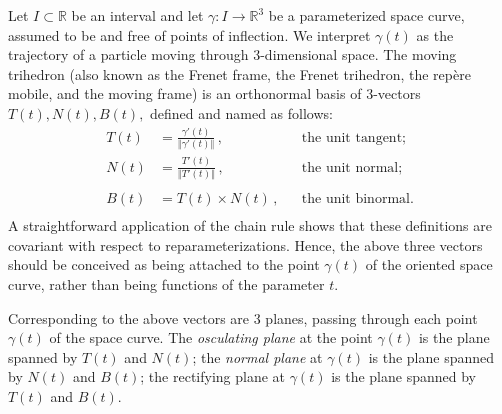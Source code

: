 \documentclass{article}
\newcommand{\reals}{\mathbb{R}}
\begin{document}
Let $I\subset \reals$ be an interval and let $\gamma:I\to\reals^3$ be a
parameterized space curve, assumed to be
 and free of points of inflection. We
interpret $\gamma(t)$ as the trajectory of a particle moving through
3-dimensional space.  The moving trihedron (also known as the Frenet
frame, the Frenet trihedron, the rep\`ere mobile, and the moving
frame) is an orthonormal basis of 3-vectors $T(t),N(t),B(t),$ defined
and named as follows:
\begin{align*}
  T(t) &= \displaystyle \frac{\gamma'(t)}{\Vert \gamma'(t) \Vert}\, ,
  &&
  \text{the unit  tangent;}\\
  N(t) &= \displaystyle \frac{T'(t)}{\Vert T'(t) \Vert} \, ,&&
  \text{the unit normal;}\\ \\
  B(t) &= T(t)\times N(t)  \, ,&& \text{the unit binormal.}\\
\end{align*}
A straightforward application of the chain rule shows that these
definitions are covariant with respect to reparameterizations.  Hence,
the above three vectors should be conceived as being attached to the
point $\gamma(t)$ of the oriented space curve, rather than being
functions of the parameter $t$.

Corresponding to the above vectors are 3 planes, passing through each
point $\gamma(t)$ of the space curve.  The \emph{osculating plane} at
the point $\gamma(t)$ is the plane spanned by $T(t)$ and $N(t)$; the
\emph{normal plane} at $\gamma(t)$ is the plane spanned by $N(t)$ and
$B(t)$; the rectifying plane at $\gamma(t)$ is the plane spanned by
$T(t)$ and $B(t)$.
\end{document}
